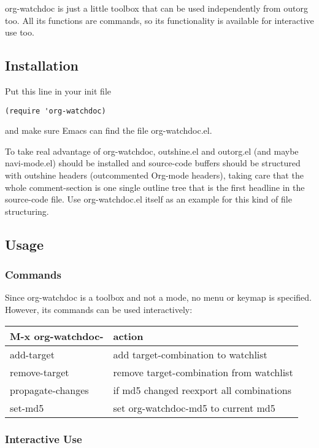 \documentclass[11pt]{article}
\begin{document}
org-watchdoc is just a little toolbox that can be used
independently from outorg too. All its functions are commands, so
its functionality is available for interactive use too.
\subsection{Installation}
\label{sec-1-3}

Put this line in your init file

\begin{verbatim}
(require 'org-watchdoc)
\end{verbatim}

and make sure Emacs can find the file org-watchdoc.el.

To take real advantage of org-watchdoc, outshine.el and outorg.el
(and maybe navi-mode.el) should be installed and source-code
buffers should be structured with outshine headers (outcommented
Org-mode headers), taking care that the whole comment-section is
one single outline tree that is the first headline in the
source-code file. Use org-watchdoc.el itself as an example for
this kind of file structuring.
\subsection{Usage}
\label{sec-1-4}

\subsubsection{Commands}
\label{sec-1-4-1}

Since org-watchdoc is a toolbox and not a mode, no menu or keymap
is specified. However, its commands can be used interactively:

\begin{center}
\begin{tabular}{ll}
M-x org-watchdoc- & action\\
\hline
add-target & add target-combination to watchlist\\
remove-target & remove target-combination from watchlist\\
propagate-changes & if md5 changed reexport all combinations\\
set-md5 & set org-watchdoc-md5 to current md5\\
\end{tabular}
\end{center}
\subsubsection{Interactive Use}
\label{sec-1-4-2}
\end{document}
